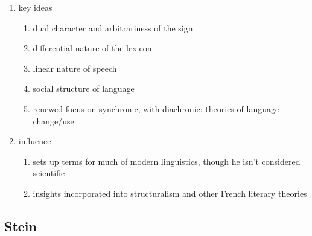\documentclass[12pt]{article}
\begin{document}
\begin{enumerate}
\begin{enumerate}
    \item difficulty organizing theoretical insights: major work unpublished, most known from an edited collection of course notes (\textit{Course in General Linguistics}
    \item notes supposedly for a potential book published in the 1990s
    \end{enumerate}
\item key ideas
    \begin{enumerate}
    \item dual character and arbitrariness of the sign
    \item differential nature of the lexicon
    \item linear nature of speech
    \item social structure of language
    \item renewed focus on synchronic, with diachronic: theories of language change/use
    \end{enumerate}
\item influence
    \begin{enumerate}
    \item sets up terms for much of modern linguistics, though he isn't considered scientific
    \item insights incorporated into structuralism and other French literary theories
    \end{enumerate}
\end{enumerate}

\subsection{Stein}
\end{document}
